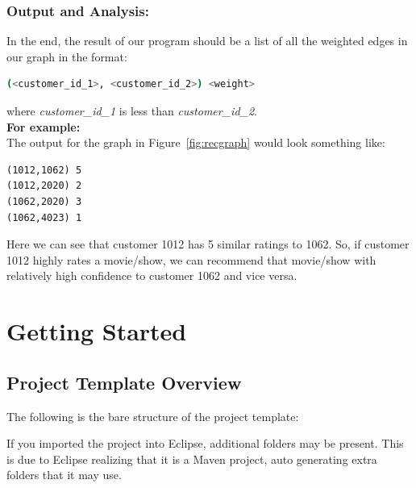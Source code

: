 \documentclass{article}
\begin{document}
\subsubsection*{Output and Analysis:}
In the end, the result of our program should be a list of all the weighted edges in our graph in the format:
\begin{lstlisting}[language=bash]
                (<customer_id_1>, <customer_id_2>) <weight> 
\end{lstlisting}
where \textit{customer\_id\_1} is less than \textit{customer\_id\_2}.\\

\noindent \textbf{For example:}\\
The output for the graph in Figure~\ref{fig:recgraph} would look something like:
\begin{Verbatim}[frame=single]
(1012,1062) 5
(1012,2020) 2
(1062,2020) 3
(1062,4023) 1
\end{Verbatim}
Here we can see that customer 1012 has 5 similar ratings to 1062. So, if customer 1012 highly rates a movie/show, we can recommend that movie/show with relatively high confidence to customer 1062 and vice versa. 

\section{Getting Started}

\subsection{Project Template Overview}

The following is the bare structure of the project template: \\


\begin{info}[Notice:]
If you imported the project into Eclipse, additional folders may be present. This is due to Eclipse realizing that it is a Maven project, auto generating extra folders that it may use.
\end{info}
\end{document}
